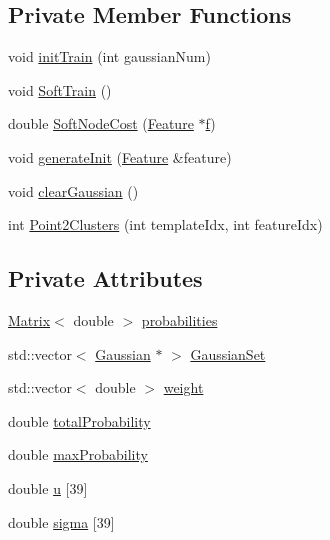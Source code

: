 \subsection*{Private Member Functions}
\begin{DoxyCompactItemize}
\item 
void \hyperlink{class_soft_state_aefea07de56ed41dcc2045ab41ff537c3}{init\+Train} (int gaussian\+Num)
\item 
void \hyperlink{class_soft_state_aba68b421a253430d22d08af0ba4fc6a1}{Soft\+Train} ()
\item 
double \hyperlink{class_soft_state_a75dab3a7b75ba766e5861140778c582d}{Soft\+Node\+Cost} (\hyperlink{class_feature}{Feature} $\ast$\hyperlink{mel2hz_8m_a09113e60f6e326656763bae1603c0eb5}{f})
\item 
void \hyperlink{class_soft_state_ac2de89f2118ddacd321d98a0f1ffd027}{generate\+Init} (\hyperlink{class_feature}{Feature} \&feature)
\item 
void \hyperlink{class_soft_state_a4c673cabb4ae1a2550301f3130e1cf58}{clear\+Gaussian} ()
\item 
int \hyperlink{class_soft_state_a13bab7a425c6aad32270fb88bd81a026}{Point2\+Clusters} (int template\+Idx, int feature\+Idx)
\end{DoxyCompactItemize}
\subsection*{Private Attributes}
\begin{DoxyCompactItemize}
\item 
\hyperlink{configure__basic_8h_a566a006016cf65b1b01bd2bc633e1c12}{Matrix}$<$ double $>$ \hyperlink{class_soft_state_ac9dbfedcf51c0d3bf104d8d4b061f2ae}{probabilities}
\item 
std\+::vector$<$ \hyperlink{class_gaussian}{Gaussian} $\ast$ $>$ \hyperlink{class_soft_state_a5bb4abdc4477467c63accf9cb5699f55}{Gaussian\+Set}
\item 
std\+::vector$<$ double $>$ \hyperlink{class_soft_state_a7b4ebb0c683371ead7d0531acb7e0c5a}{weight}
\item 
double \hyperlink{class_soft_state_ace0f0548a8ece0e43299f7291c9155e2}{total\+Probability}
\item 
double \hyperlink{class_soft_state_a5172fb3fe754e9599b47fb738023d7cc}{max\+Probability}
\item 
double \hyperlink{class_soft_state_a7ac1e0c5327ce8dddd74bd649ed615e0}{u} \mbox{[}39\mbox{]}
\item 
double \hyperlink{class_soft_state_a329aa0dcdc7c6d628014e5ad86566c52}{sigma} \mbox{[}39\mbox{]}
\end{DoxyCompactItemize}
